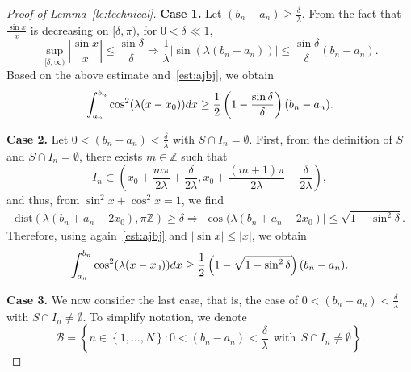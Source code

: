 \documentclass[10pt,a4paper]{amsart}
\def \d {{\rm{d}}}
\begin{document}
\begin{proof}[Proof of Lemma~\ref{le:technical}]
\smallskip
\textbf{Case 1.} Let $(b_{n}-a_{n})\ge \frac{\delta}{\lambda}$. From the fact that $\frac{\sin x}{x}$ is decreasing on $[\delta,\pi)$, for $0<\delta\ll 1$, 
\begin{equation*}
\sup_{[\delta,\infty)}\left|\frac{\sin x}{x}\right|\le \frac{\sin \delta}{\delta} \Longrightarrow \frac{1}{\lambda}\left|\sin \left(\lambda(b_{n}-a_{n})\right)\right|\le \frac{\sin \delta}{\delta}(b_{n}-a_{n}).
\end{equation*}
Based on the above estimate and~\eqref{est:ajbj}, we obtain
\begin{equation}\label{est:case1}
\int_{a_{n}}^{b_{n}}\cos^{2}(\lambda(x-x_{0}))\d x
\ge \frac{1}{2}\left(1-\frac{\sin \delta}{\delta}\right)(b_{n}-a_{n}).
\end{equation}

\textbf{Case 2.} Let $0<(b_{n}-a_{n})< \frac{\delta}{\lambda}$ with $S\cap I_{n}= \emptyset$. First, from the definition of $S$ and $S\cap I_{n}=\emptyset$, there exists $m\in \mathbb{Z}$ such that 
\begin{equation*}
    I_{n}\subset \left(x_{0}+\frac{m \pi }{2\lambda}+\frac{\delta}{2\lambda},x_{0}+\frac{ (m+1)\pi}{2\lambda}-\frac{\delta}{2\lambda}\right),
    \end{equation*}
    and thus, from $\sin^{2}x+\cos^{2}x=1$, we find
    \begin{equation*}
    \begin{aligned}
   \mbox{dist}(\lambda(b_{n}+a_{n}-2x_{0}),\pi\mathbb{Z})\ge \delta\Longrightarrow
    \left|\cos (\lambda(b_{n}+a_{n}-2x_{0})\right|\le \sqrt{1-\sin^{2}\delta}.
    \end{aligned}
    \end{equation*}
    Therefore, using again~\eqref{est:ajbj} and $|\sin x|\le |x|$, we obtain
    \begin{equation}\label{est:case2}
        \int_{a_{n}}^{b_{n}}\cos^{2}(\lambda(x-x_{0}))\d x\ge
        \frac{1}{2}\left(1-\sqrt{1-\sin^{2}\delta}\right)(b_{n}-a_{n}).
        \end{equation}

\textbf{Case 3.} We now consider the last case, that is, the case of $0<(b_{n}-a_{n})< \frac{\delta}{\lambda}$ with $S\cap I_{n}\ne  \emptyset$. To simplify notation, we denote 
\begin{equation*}
    \mathcal{B}=\left\{n\in\left\{1,\dots,N\right\}:0<(b_{n}-a_{n})< \frac{\delta}{\lambda}\ \ \mbox{with} \ \ S\cap I_{n}\ne  \emptyset\right\}.
\end{equation*}


\end{proof}
\end{document}
